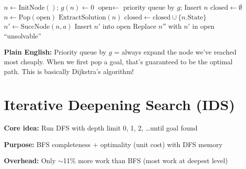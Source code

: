 \documentclass[11pt,a4paper]{article}
\begin{document}
\begin{examplebox}
\begin{algorithmic}
\STATE $n \gets \text{InitNode}()$; $g(n) \gets 0$ 
\STATE $\text{open} \gets$ priority queue by $g$; Insert $n$ 
\STATE $\text{closed} \gets \emptyset$ 
    \STATE $n \gets \text{Pop}(\text{open})$ 
     
        \RETURN $\text{ExtractSolution}(n)$
    \ENDIF
    \STATE $\text{closed} \gets \text{closed} \cup \{n.\text{State}\}$ 
        \STATE $n' \gets \text{SuccNode}(n, a)$ 
            \STATE Insert $n'$ into open 
            \STATE Replace $n''$ with $n'$ in open 
        \ENDIF
    \ENDFOR
\ENDWHILE
\RETURN ``unsolvable''
\end{algorithmic}
\textbf{Plain English:} Priority queue by $g$ = always expand the node we've reached most cheaply. When we first pop a goal, that's guaranteed to be the optimal path. This is basically Dijkstra's algorithm!
\end{examplebox}

\section{Iterative Deepening Search (IDS)}

\begin{definitionbox}
\textbf{Core idea:} Run DFS with depth limit 0, 1, 2, \ldots until goal found

\textbf{Purpose:} BFS completeness + optimality (unit cost) with DFS memory

\textbf{Overhead:} Only $\sim$11\% more work than BFS (most work at deepest level)
\end{definitionbox}
\end{document}

